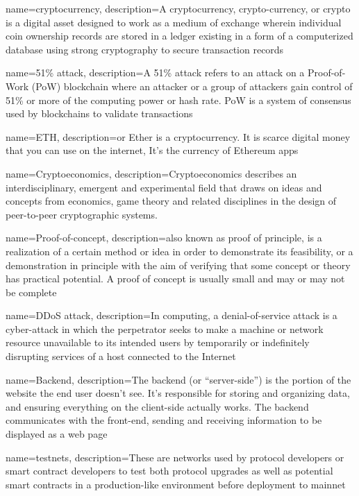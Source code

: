 \makeglossaries
 
{
    name=cryptocurrency,
    description={A cryptocurrency, crypto-currency, or crypto is a digital asset designed to work as a medium of exchange wherein individual coin ownership records are stored in a ledger existing in a form of a computerized database using strong cryptography to secure transaction records}
}

{
    name=51\% attack,
    description={A 51\% attack refers to an attack on a Proof-of-Work (PoW) blockchain where an attacker or a group of attackers gain control of 51\% or more of the computing power or hash rate. PoW is a system of consensus used by blockchains to validate transactions}
}

{
    name=ETH,
    description={or Ether is a cryptocurrency. It is scarce digital money that you can use on the internet, It's the currency of Ethereum apps}
}

{
    name=Cryptoeconomics,
    description={Cryptoeconomics describes an interdisciplinary, emergent and experimental field that draws on ideas and concepts from economics, game theory and related disciplines in the design of peer-to-peer cryptographic systems.}
}

{
    name=Proof-of-concept,
    description={also known as proof of principle, is a realization of a certain method or idea in order to demonstrate its feasibility, or a demonstration in principle with the aim of verifying that some concept or theory has practical potential. A proof of concept is usually small and may or may not be complete}
}

{
    name=DDoS attack,
    description={In computing, a denial-of-service attack is a cyber-attack in which the perpetrator seeks to make a machine or network resource unavailable to its intended users by temporarily or indefinitely disrupting services of a host connected to the Internet}
}

{
    name=Backend,
    description={The backend (or “server-side”) is the portion of the website the end user doesn't see. It's responsible for storing and organizing data, and ensuring everything on the client-side actually works. The backend communicates with the front-end, sending and receiving information to be displayed as a web page}
}

{
    name=testnets,
    description={These are networks used by protocol developers or smart contract developers to test both protocol upgrades as well as potential smart contracts in a production-like environment before deployment to mainnet}
}